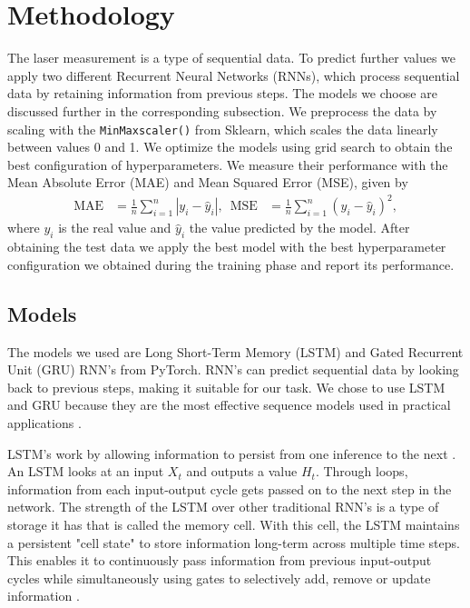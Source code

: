 \documentclass[conference]{IEEEtran}
\begin{document}
\section{Methodology}
The laser measurement is a type of sequential data. To predict further values we apply two different Recurrent Neural Networks (RNNs), which process sequential data by retaining information from previous steps. The models we choose are discussed further in the corresponding subsection. We preprocess the data by scaling with the \texttt{MinMaxscaler()} from Sklearn, which scales the data linearly between values 0 and 1. We optimize the models using grid search to obtain the best configuration of hyperparameters. We measure their performance with the Mean Absolute Error (MAE) and Mean Squared Error (MSE), given by
\begin{align}
	\mathrm{MAE} & = \frac{1}{n} \sum_{i=1}^{n} | y_i - \hat{y}_i |, \,\,\, \mathrm{MSE} & = \frac{1}{n} \sum_{i=1}^{n} (y_i - \hat{y}_i)^2,
\end{align}
where $y_i$ is the real value and $\hat{y}_i$ the value predicted by the model. After obtaining the test data we apply the best model with the best hyperparameter configuration we obtained during the training phase and report its performance.

\subsection{Models}
The models we used are Long Short-Term Memory (LSTM) and Gated Recurrent Unit (GRU) RNN's from PyTorch. RNN's can predict sequential data by looking back to previous steps, making it suitable for our task. We chose to use LSTM and GRU because they are the most effective sequence models used in practical applications \cite{Goodfellow2016}.

LSTM's work by allowing information to persist from one inference to the next \cite{Noble2025}. An LSTM looks at an input $X_t$ and outputs a value $H_t$. Through loops, information from each input-output cycle gets passed on to the next step in the network. The strength of the LSTM over other traditional RNN's is a type of storage it has that is called the memory cell. With this cell, the LSTM maintains a persistent "cell state" to store information long-term across multiple time steps. This enables it to continuously pass information from previous input-output cycles while simultaneously using gates to selectively add, remove or update information \cite{Noble2025}.
\end{document}
